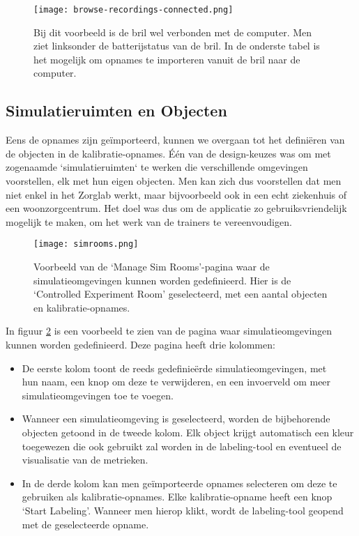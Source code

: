\begin{figure}[H]
  \centering
  \texttt{[image: browse-recordings-connected.png]}
  \caption[
    Screenshot van de `Browse Recordings'-pagina
  ]{\label{fig:browse-recordings-connected} Bij dit voorbeeld is de bril wel verbonden met de computer. Men ziet linksonder de batterijstatus van de bril. In de onderste tabel is het mogelijk om opnames te importeren vanuit de bril naar de computer. }
\end{figure}

\subsection{Simulatieruimten en Objecten}

Eens de opnames zijn geïmporteerd, kunnen we overgaan tot het definiëren van de objecten in de kalibratie-opnames. Één van de design-keuzes was om met zogenaamde `simulatieruimten` te werken die verschillende omgevingen voorstellen, elk met hun eigen objecten.
Men kan zich dus voorstellen dat men niet enkel in het Zorglab werkt, maar bijvoorbeeld ook in een echt ziekenhuis of een woonzorgcentrum. Het doel was dus om de applicatie zo gebruiksvriendelijk mogelijk te maken, om het werk van de trainers te vereenvoudigen.

\begin{figure}[H]
  \centering
  \texttt{[image: simrooms.png]}
  \caption[
  Voorbeeld van de `Manage Sim Rooms'-pagina
  ]{\label{fig:simrooms} Voorbeeld van de `Manage Sim Rooms'-pagina waar de simulatieomgevingen kunnen worden gedefinieerd. Hier is de `Controlled Experiment Room' geselecteerd, met een aantal objecten en kalibratie-opnames. }
\end{figure}

In figuur \ref{fig:simrooms} is een voorbeeld te zien van de pagina waar simulatieomgevingen kunnen worden gedefinieerd. 
Deze pagina heeft drie kolommen:
\begin{itemize}
    \item De eerste kolom toont de reeds gedefinieërde simulatieomgevingen, met\\ hun naam, een knop om deze te verwijderen, en een invoerveld om meer simulatieomgevingen toe te voegen.
    \item Wanneer een simulatieomgeving is geselecteerd, worden de bijbehorende objecten getoond in de tweede kolom. Elk object krijgt automatisch een kleur toegewezen die ook gebruikt zal worden in de labeling-tool en eventueel de visualisatie van de metrieken.
    \item In de derde kolom kan men geïmporteerde opnames selecteren om deze te gebruiken als kalibratie-opnames. Elke kalibratie-opname heeft een knop `Start Labeling'. Wanneer men hierop klikt, wordt de labeling-tool geopend met de geselecteerde opname.
\end{itemize}

